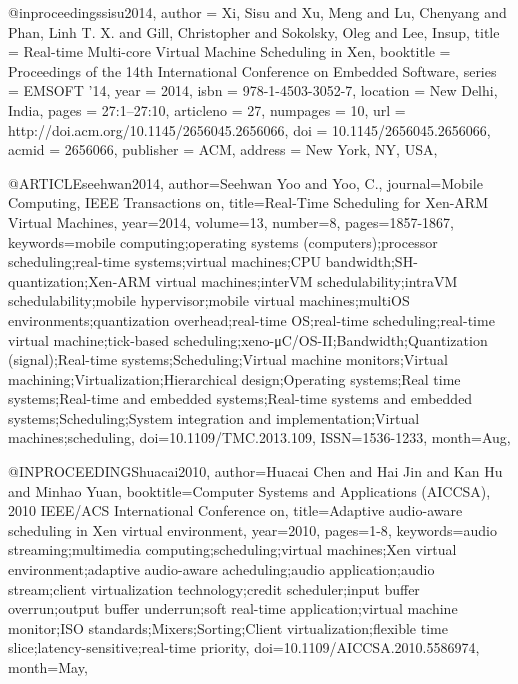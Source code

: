 @inproceedings{sisu2014,
 author = {Xi, Sisu and Xu, Meng and Lu, Chenyang and Phan, Linh T. X. and Gill, Christopher and Sokolsky, Oleg and Lee, Insup},
 title = {Real-time Multi-core Virtual Machine Scheduling in Xen},
 booktitle = {Proceedings of the 14th International Conference on Embedded Software},
 series = {EMSOFT '14},
 year = {2014},
 isbn = {978-1-4503-3052-7},
 location = {New Delhi, India},
 pages = {27:1--27:10},
 articleno = {27},
 numpages = {10},
 url = {http://doi.acm.org/10.1145/2656045.2656066},
 doi = {10.1145/2656045.2656066},
 acmid = {2656066},
 publisher = {ACM},
 address = {New York, NY, USA},
}

@ARTICLE{seehwan2014, 
author={Seehwan Yoo and Yoo, C.}, 
journal={Mobile Computing, IEEE Transactions on}, 
title={Real-Time Scheduling for Xen-ARM Virtual Machines}, 
year={2014}, 
volume={13}, 
number={8}, 
pages={1857-1867}, 
keywords={mobile computing;operating systems (computers);processor scheduling;real-time systems;virtual machines;CPU bandwidth;SH-quantization;Xen-ARM virtual machines;interVM schedulability;intraVM schedulability;mobile hypervisor;mobile virtual machines;multiOS environments;quantization overhead;real-time OS;real-time scheduling;real-time virtual machine;tick-based scheduling;xeno-μC/OS-II;Bandwidth;Quantization (signal);Real-time systems;Scheduling;Virtual machine monitors;Virtual machining;Virtualization;Hierarchical design;Operating systems;Real time systems;Real-time and embedded systems;Real-time systems and embedded systems;Scheduling;System integration and implementation;Virtual machines;scheduling}, 
doi={10.1109/TMC.2013.109}, 
ISSN={1536-1233}, 
month={Aug},}


@INPROCEEDINGS{huacai2010, 
author={Huacai Chen and Hai Jin and Kan Hu and Minhao Yuan}, 
booktitle={Computer Systems and Applications (AICCSA), 2010 IEEE/ACS International Conference on}, 
title={Adaptive audio-aware scheduling in Xen virtual environment}, 
year={2010}, 
pages={1-8}, 
keywords={audio streaming;multimedia computing;scheduling;virtual machines;Xen virtual environment;adaptive audio-aware acheduling;audio application;audio stream;client virtualization technology;credit scheduler;input buffer overrun;output buffer underrun;soft real-time application;virtual machine monitor;ISO standards;Mixers;Sorting;Client virtualization;flexible time slice;latency-sensitive;real-time priority}, 
doi={10.1109/AICCSA.2010.5586974}, 
month={May},}

